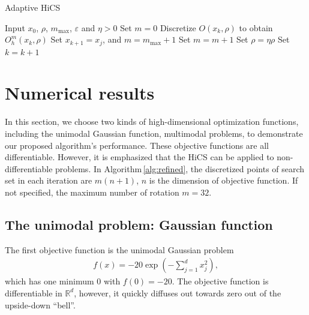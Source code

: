 \documentclass[mathpazo]{csam}
\newcommand{\bbR}{\mathbb{R}}
\theoremstyle{remark}
\begin{document}
\begin{algorithm}[H]
	\caption{Adaptive HiCS}
	\label{alg:AHiCS}
\begin{algorithmic}[1]
	\STATE Input $x_0$, $\rho$, $m_{\max}$,
	$\varepsilon$ and $\eta>0$
	\IF {  $\rho>\varepsilon$}
		\STATE Set $m=0$
			\STATE Discretize $O(x_k,\rho)$ to obtain $O^m_h(x_k,\rho)$
			\STATE Set $x_{k+1}=x_j$, 
				and $m=m_{\max}+1$
			\ELSE
				\STATE Set $m = m+1$
			\ENDIF
		\ELSE
			\STATE Set $\rho=\eta\rho$
		\ENDIF
		\STATE Set $k=k+1$
	\ENDFOR
\ENDIF
\end{algorithmic}
\end{algorithm}


\section{Numerical results}
\label{sec:experiment}

In this section, we choose two kinds of high-dimensional optimization functions, including the unimodal Gaussian function, multimodal problems, to demonstrate our proposed algorithm's performance. 
These objective functions are all differentiable. However, it is
emphasized that the HiCS can be applied to non-differentiable problems. 
In Algorithm\,\ref{alg:refined}, the discretized points of 
search set in each iteration are $m(n+1)$, $n$ is the dimension
of objective function. If not specified, the maximum number of
rotation $m=32$.

\subsection{The unimodal problem: Gaussian function}
\label{subsec:gauss}

The first objective function is the unimodal Gaussian problem
\begin{align}
	f(x) = -20\exp\left(-\sum_{j=1}^d x_j^2 \right),
	\label{eqn:exp1}
\end{align}
which has one minimum $0$ with $f(0)=-20$.
The objective function is differentiable in $\bbR^d$, however,
it quickly diffuses out towards zero out of the upside-down ``bell''. 
\end{document}
